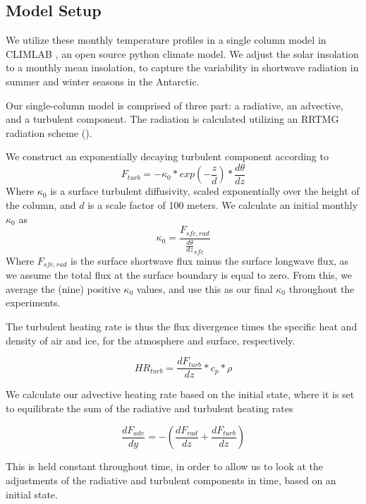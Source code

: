 \documentclass[12]{article}
\begin{document}
\subsection{Model Setup}
We utilize these monthly temperature profiles in a single column model in CLIMLAB \citep{rose_climlab_2018}, an open source python climate model. We adjust the solar insolation to a monthly mean insolation, to capture the variability in shortwave radiation in summer and winter seasons in the Antarctic. 

Our single-column model is comprised of three part: a radiative, an advective, and a turbulent component. The radiation is calculated utilizing an RRTMG radiation scheme (). 

We construct an exponentially decaying turbulent component according to
\begin{equation}
    F_{turb} = -\kappa_0*exp(-\frac{z}{d})*\frac{d\theta}{dz}
\end{equation}
Where $\kappa_0$ is a surface turbulent diffusivity, scaled exponentially over the height of the column, and $d$ is a scale factor of 100 meters. We calculate an initial monthly $\kappa_0$ as
\begin{equation}
    \kappa_0 = \frac{F_{sfc, rad}}{\frac{d\theta}{dz}_{sfc}}
\end{equation}
Where $F_{sfc, rad}$ is the surface shortwave flux minus the surface longwave flux, as we assume the total flux at the surface boundary is equal to zero. From this, we average the (nine) positive $\kappa_0$ values, and use this as our final $\kappa_0$ throughout the experiments.

The turbulent heating rate is thus the flux divergence times the specific heat and density of air and ice, for the atmosphere and surface, respectively.

\begin{equation}
    HR_{turb} = \frac{dF_{turb}}{dz} * c_p * \rho
\end{equation}

We calculate our advective heating rate based on the initial state, where it is set to equilibrate the sum of the radiative and turbulent heating rates

\begin{equation}
    \frac{dF_{adv}}{dy} = -(\frac{dF_{rad}}{dz} + \frac{dF_{turb}}{dz})
\end{equation}

This is held constant throughout time, in order to allow us to look at the adjustments of the radiative and turbulent components in time, based on an initial state. 
\end{document}

